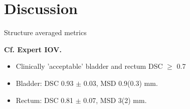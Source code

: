 \documentclass[9pt]{beamer}
\begin{document}
%
\section{Discussion}
\begin{frame}{Structure averaged metrics}


\vspace{4mm}

\vspace{4mm}
\textbf{Cf. Expert IOV.}\footnotemark[2]
\begin{itemize}
\item Clinically 'acceptable' bladder and rectum DSC $\geq$ 0.7
\item Bladder:  DSC 0.93 $\pm$ 0.03, MSD 0.9(0.3) mm.
\item Rectum:  DSC 0.81 $\pm$ 0.07, MSD 3(2) mm.
\end{itemize}
\end{frame}
%
%
%

\end{document}
